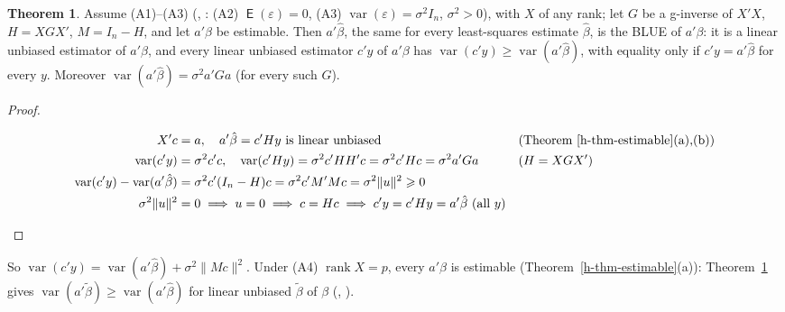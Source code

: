 \documentclass[12pt]{article}
\DeclareMathOperator{\rank}{rank}
\DeclareMathOperator\expc{\mathsf{E}}
\DeclareMathOperator\var{var}
\theoremstyle{definition}
\newtheorem{theorem}{Theorem}
\newcommand{\boardtop}{\vspace*{-\abovedisplayskip}}
\begin{document}
\begin{theorem}\label{h-thm-blue}
Assume (A1)--(A3) (, : (A2) \(\expc(\varepsilon)=0\), (A3) \(\var(\varepsilon)=\sigma^2I_n\),
\(\sigma^2>0\)), with \(X\) of any rank; let \(G\) be a g-inverse of \(X'X\), \(H=XGX'\), \(M=I_n-H\), and let
\(a'\beta\) be estimable. Then \(a'\hat\beta\), the same for every least-squares estimate \(\hat\beta\), is the BLUE of
\(a'\beta\): it is a linear unbiased estimator of \(a'\beta\), and every linear unbiased estimator \(c'y\) of \(a'\beta\)
has \(\var(c'y)\geqslant\var(a'\hat\beta)\), with equality only if \(c'y=a'\hat\beta\) for every \(y\). Moreover
\(\var(a'\hat\beta)=\sigma^2a'Ga\) (for every such \(G\)).
\end{theorem}
\begin{proof}
\begin{board}[\(c'y\) a linear unbiased estimator of \(a'\beta\); (A3) gives \(\var(y)=\sigma^2I_n\) (\lec{11},
\lit{Definition~1}); \(\var(Az+b)=A\var(z)A'\) (\lec{9}, \lit{Theorem~3}(b)); \(H'=H=H^2\), \(M'=M=M^2\) (\lec{11},
\lit{Theorem~10}(c)); \(\lVert u\rVert^2=u'u\) is \(0\) only for \(u=0\) (\lec{6}, \lit{Definition~1}); \(u=Mc\):]
\boardtop
\begin{align*}
X'c&=a,\quad a'\hat\beta=c'Hy\ \text{is linear unbiased}&&\text{(Theorem~\ref{h-thm-estimable}(a),(b))}\\
\var(c'y)&=\sigma^2c'c,\quad\var(c'Hy)=\sigma^2c'HH'c=\sigma^2c'Hc=\sigma^2a'Ga&&\text{(\(H=XGX'\))}\\
\var(c'y)-\var(a'\hat\beta)&=\sigma^2c'(I_n-H)c=\sigma^2c'M'Mc=\sigma^2\lVert u\rVert^2\geqslant0\\
\sigma^2\lVert u\rVert^2&=0\implies u=0\implies c=Hc\implies c'y=c'Hy=a'\hat\beta\ (\text{all }y)
\end{align*}
\end{board}
\nopagebreak
\end{proof}
So \(\var(c'y)=\var(a'\hat\beta)+\sigma^2\lVert Mc\rVert^2\). Under (A4) \(\rank X=p\), every \(a'\beta\) is
estimable (Theorem~\ref{h-thm-estimable}(a)): Theorem~\ref{h-thm-blue} gives \(\var(a'\tilde\beta)\geqslant\var(a'\hat\beta)\)
for linear unbiased \(\tilde\beta\) of \(\beta\) (, ).
\end{document}
